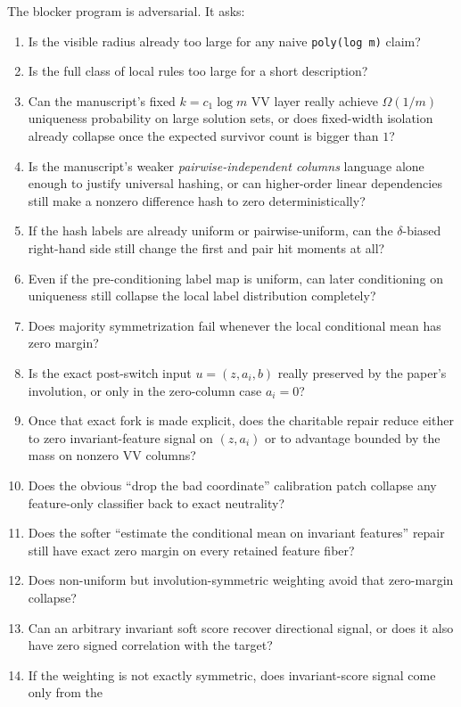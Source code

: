 \documentclass[11pt]{article}
\theoremstyle{remark}
\begin{document}
The blocker program is adversarial.  It asks:
\begin{enumerate}[leftmargin=1.5em]
  \item Is the visible radius already too large for any naive \texttt{poly(log m)} claim?
  \item Is the full class of local rules too large for a short description?
  \item Can the manuscript's fixed \(k=c_1\log m\) VV layer really achieve \(\Omega(1/m)\)
  uniqueness probability on large solution sets, or does fixed-width isolation already collapse
  once the expected survivor count is bigger than \(1\)?
  \item Is the manuscript's weaker \emph{pairwise-independent columns} language alone enough to
  justify universal hashing, or can higher-order linear dependencies still make a nonzero
  difference hash to zero deterministically?
  \item If the hash labels are already uniform or pairwise-uniform, can the \(\delta\)-biased
  right-hand side still change the first and pair hit moments at all?
  \item Even if the pre-conditioning label map is uniform, can later conditioning on uniqueness
  still collapse the local label distribution completely?
  \item Does majority symmetrization fail whenever the local conditional mean has zero margin?
  \item Is the exact post-switch input \(u=(z,a_i,b)\) really preserved by the paper's involution,
  or only in the zero-column case \(a_i=0\)?
  \item Once that exact fork is made explicit, does the charitable repair reduce either to zero
  invariant-feature signal on \((z,a_i)\) or to advantage bounded by the mass on nonzero VV columns?
  \item Does the obvious ``drop the bad coordinate'' calibration patch collapse any feature-only
  classifier back to exact neutrality?
  \item Does the softer ``estimate the conditional mean on invariant features'' repair still have
  exact zero margin on every retained feature fiber?
  \item Does non-uniform but involution-symmetric weighting avoid that zero-margin collapse?
  \item Can an arbitrary invariant soft score recover directional signal, or does it also have zero
  signed correlation with the target?
  \item If the weighting is not exactly symmetric, does invariant-score signal come only from the

\end{enumerate}
\end{document}
